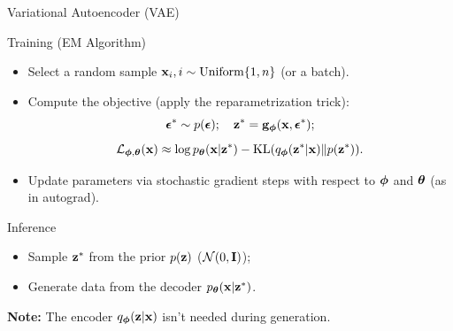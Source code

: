 \documentclass{beamer}
\begin{document}
\begin{frame}{Variational Autoencoder (VAE)}
	\begin{block}{Training (EM Algorithm)}
		\begin{itemize}
			\item Select a random sample $\mathbf{x}_i, i \sim \text{Uniform}\{1, n\}$ (or a batch).
			\eqpause
			\item Compute the objective (apply the reparametrization trick):
			\vspace{-0.3cm}
			\[
				\boldsymbol{\epsilon}^* \sim p(\boldsymbol{\epsilon}); \quad \mathbf{z}^* = \mathbf{g}_{\boldsymbol{\phi}}(\mathbf{x}, \boldsymbol{\epsilon}^*);
			\]
			\[
				\mathcal{L}_{\boldsymbol{\phi}, \boldsymbol{\theta}}(\mathbf{x}) \approx  \log p_{\boldsymbol{\theta}}(\mathbf{x} | \mathbf{z}^*) - \mathrm{KL}(q_{\boldsymbol{\phi}}(\mathbf{z}^*| \mathbf{x}) \| p(\mathbf{z}^*)).
			\]
			\eqpause
			\vspace{-0.5cm}
			\item Update parameters via stochastic gradient steps with respect to $\boldsymbol{\phi}$ and $\boldsymbol{\theta}$ (as in autograd).
		\end{itemize}
	\end{block}
	\eqpause
	\begin{block}{Inference}
		\begin{itemize}
			\item Sample $\mathbf{z}^*$ from the prior $p(\mathbf{z})$ ($\mathcal{N}(0, \mathbf{I})$);
			\eqpause
			\item Generate data from the decoder $p_{\boldsymbol{\theta}}(\mathbf{x} | \mathbf{z}^*)$.
		\end{itemize}
	\end{block}
	\eqpause
	\textbf{Note:} The encoder $q_{\boldsymbol{\phi}}(\mathbf{z}| \mathbf{x})$ isn't needed during generation.
\end{frame}
\end{document}
